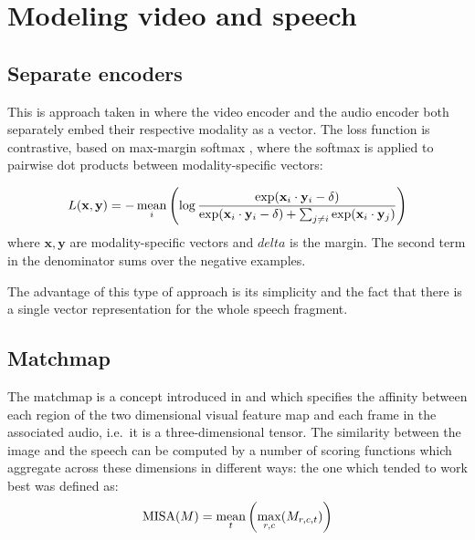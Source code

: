 \appendix
\section{Modeling video and speech}


\subsection{Separate encoders}
This is approach taken in \citet{rouditchenko2020avlnet} where the
video encoder and the audio encoder both separately embed their respective
modality as a vector. The loss function is contrastive, based on
max-margin softmax \citep{ilharco-etal-2019-large}, where the softmax
is applied to pairwise dot products between modality-specific vectors:

\begin{equation}
  \label{eq:mms}
  L(\mathbf{x}, \mathbf{y}) = - \operatorname*{mean}_i \left(
    \log \frac{\exp(\mathbf{x}_i\cdot \mathbf{y}_i-\delta)}
    { \exp(\mathbf{x}_i\cdot \mathbf{y}_i-\delta) + \sum_{j\neq i}
      \exp(\mathbf{x}_i \cdot \mathbf{y}_j)  }
  \right)
\end{equation}
where $\mathbf{x, y}$ are modality-specific vectors and $delta$ is the
margin. The second term in the denominator sums over the negative
examples.

The advantage of this type of approach is its simplicity and the fact
that there is a single vector representation for the whole speech
fragment.

\subsection{Matchmap}
The matchmap is a concept introduced in \citet{harwath2018jointly} and
which specifies the affinity between each region of the two
dimensional visual feature map and each frame in the associated audio,
i.e.\ it is a three-dimensional tensor. The similarity between the
image and the speech can be computed by a number of scoring functions
which aggregate across these dimensions in different ways: the one
which tended to work best was defined as:
\begin{equation}
  \label{eq:misa}
  \mathrm{MISA}(M) = \operatorname*{mean}_t \left(\max_{r,c}(M_{r,c,t})\right)
\end{equation}

